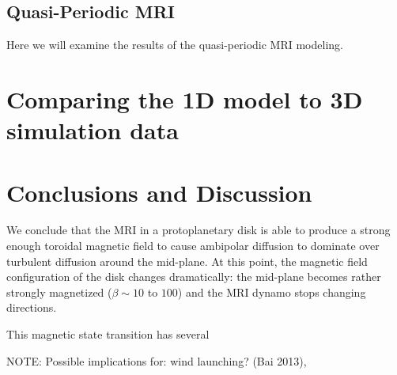 

\subsection{Quasi-Periodic MRI}
Here we will examine the results of the quasi-periodic MRI modeling.  






\newpage
\section{Comparing the 1D model to 3D simulation data}





\newpage
\section{Conclusions and Discussion}
We conclude that the MRI in a protoplanetary disk is able to produce a strong enough toroidal magnetic field to cause ambipolar diffusion to dominate over turbulent diffusion around the mid-plane.  At this point, the magnetic field configuration of the disk changes dramatically: the mid-plane becomes rather strongly magnetized ($\beta \sim 10$ to $100$) and the MRI dynamo stops changing directions.

This magnetic state transition has several 

NOTE: Possible implications for: wind launching? (Bai 2013), 





